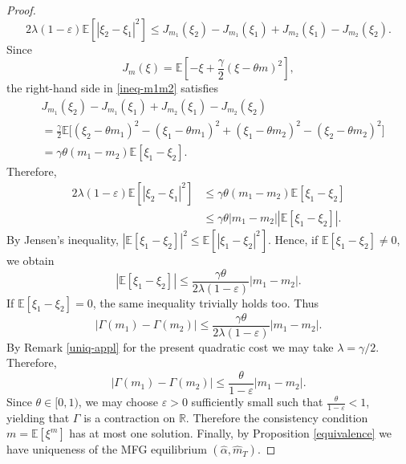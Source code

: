 \documentclass[10pt,a4paper]{amsart}
\begin{document}
\begin{proof}
\begin{equation}
2\lambda (1-\varepsilon)\mathbb E \left[|\xi_2-\xi_1|^2 \right]\le
J_{m_1}(\xi_2)-J_{m_1}(\xi_1)+J_{m_2}(\xi_1)-J_{m_2}(\xi_2).
\end{equation}
Since
\[
J_m(\xi)=\mathbb E\left[-\xi+\frac{\gamma}{2}(\xi-\theta m)^2\right],
\]
the right-hand side in \eqref{ineq-m1m2} satisfies
\[
\begin{aligned}
&J_{m_1}(\xi_2)-J_{m_1}(\xi_1)+J_{m_2}(\xi_1)-J_{m_2}(\xi_2) \\
&=\frac{\gamma}{2}\mathbb E\Big[(\xi_2-\theta m_1)^2-(\xi_1-\theta m_1)^2+(\xi_1-\theta m_2)^2-(\xi_2-\theta m_2)^2\Big]\\
&=\gamma\theta(m_1-m_2)\mathbb E[\xi_1-\xi_2].
\end{aligned}
\]
Therefore,
\begin{align*}
2\lambda (1-\varepsilon)\mathbb E \left[|\xi_2-\xi_1|^2 \right] & \le \gamma\theta(m_1-m_2)\mathbb E[\xi_1-\xi_2]\\
& \le \gamma\theta |m_1-m_2|\left|\mathbb E[\xi_1-\xi_2]\right|.
\end{align*}
By Jensen's inequality,
$\left|\mathbb E[\xi_1-\xi_2]\right|^2 \le \mathbb E\left[|\xi_1-\xi_2|^2\right]$.
Hence, if \(\mathbb E[\xi_1-\xi_2]\neq0\), we obtain
\[
\left|\mathbb E[\xi_1-\xi_2]\right| \le\frac{\gamma\theta}{2\lambda(1-\varepsilon)}|m_1-m_2|.
\]
If \(\mathbb E[\xi_1-\xi_2]=0\), the same inequality trivially holds too. Thus
\[
|\Gamma(m_1)-\Gamma(m_2)|\le\frac{\gamma\theta}{2\lambda(1-\varepsilon)}|m_1-m_2|.
\]
By Remark \ref{uniq-appl}  for the present quadratic cost we may take \(\lambda=\gamma/2\). Therefore,
\[
|\Gamma(m_1)-\Gamma(m_2)| \le \frac{\theta}{1-\varepsilon} |m_1-m_2|.
\]
Since \(\theta\in[0,1)\), we may choose \(\varepsilon>0\) sufficiently small such that $\frac{\theta}{1-\varepsilon}<1$, yielding that \(\Gamma\) is a contraction on \(\mathbb R\). Therefore the consistency condition
$m=\mathbb E[\xi^m]$
has at most one solution. Finally, by Proposition \ref{equivalence} we have  uniqueness of the MFG equilibrium $(\hat \alpha, \hat m_T)$.
\end{proof}
\end{document}

